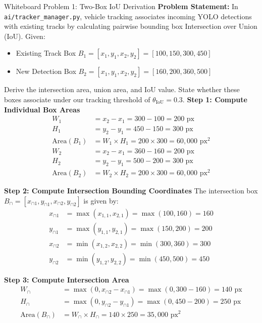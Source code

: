 \begin{interviewq}{Whiteboard Problem 1: Two-Box IoU Derivation}
\textbf{Problem Statement:}
In \texttt{ai/tracker\_manager.py}, vehicle tracking associates incoming YOLO detections with existing tracks by calculating pairwise bounding box Intersection over Union (IoU). Given:
\begin{itemize}
    \item Existing Track Box $B_1 = [x_1, y_1, x_2, y_2] = [100, 150, 300, 450]$
    \item New Detection Box $B_2 = [x_1, y_1, x_2, y_2] = [160, 200, 360, 500]$
\end{itemize}
Derive the intersection area, union area, and IoU value. State whether these boxes associate under our tracking threshold of $\theta_{\text{IoU}} = 0.3$.
\tcblower
\textbf{Step 1: Compute Individual Box Areas}
\begin{align*}
W_1 &= x_2 - x_1 = 300 - 100 = 200 \text{ px} \\
H_1 &= y_2 - y_1 = 450 - 150 = 300 \text{ px} \\
\text{Area}(B_1) &= W_1 \times H_1 = 200 \times 300 = 60{,}000 \text{ px}^2 \\[6pt]
W_2 &= x_2 - x_1 = 360 - 160 = 200 \text{ px} \\
H_2 &= y_2 - y_1 = 500 - 200 = 300 \text{ px} \\
\text{Area}(B_2) &= W_2 \times H_2 = 200 \times 300 = 60{,}000 \text{ px}^2
\end{align*}

\textbf{Step 2: Compute Intersection Bounding Coordinates}
The intersection box $B_{\cap} = [x_{\cap 1}, y_{\cap 1}, x_{\cap 2}, y_{\cap 2}]$ is given by:
\begin{align*}
x_{\cap 1} &= \max(x_{1,1}, x_{2,1}) = \max(100, 160) = 160 \\
y_{\cap 1} &= \max(y_{1,1}, y_{2,1}) = \max(150, 200) = 200 \\
x_{\cap 2} &= \min(x_{1,2}, x_{2,2}) = \min(300, 360) = 300 \\
y_{\cap 2} &= \min(y_{1,2}, y_{2,2}) = \min(450, 500) = 450
\end{align*}

\textbf{Step 3: Compute Intersection Area}
\begin{align*}
W_{\cap} &= \max(0, x_{\cap 2} - x_{\cap 1}) = \max(0, 300 - 160) = 140 \text{ px} \\
H_{\cap} &= \max(0, y_{\cap 2} - y_{\cap 1}) = \max(0, 450 - 200) = 250 \text{ px} \\
\text{Area}(B_{\cap}) &= W_{\cap} \times H_{\cap} = 140 \times 250 = 35{,}000 \text{ px}^2
\end{align*}


\end{interviewq}
